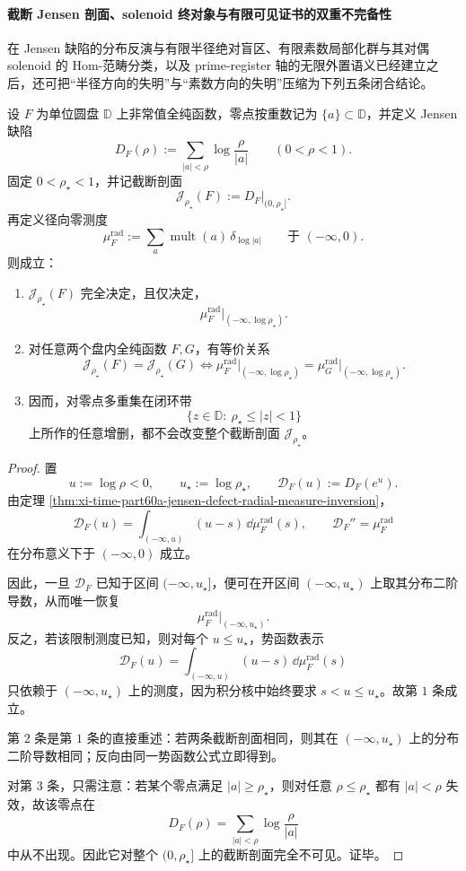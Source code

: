 \paragraph{截断 Jensen 剖面、solenoid 终对象与有限可见证书的双重不完备性}
在 Jensen 缺陷的分布反演与有限半径绝对盲区、有限素数局部化群与其对偶 solenoid 的 \(\mathrm{Hom}\)-范畴分类，以及 prime-register 轴的无限外置语义已经建立之后，还可把“半径方向的失明”与“素数方向的失明”压缩为下列五条闭合结论。

\begin{theorem}\label{thm:xi-time-part60e-truncated-jensen-profile-completeness-blindness}
设 \(F\) 为单位圆盘 \(\mathbb D\) 上非常值全纯函数，零点按重数记为 \(\{a\}\subset\mathbb D\)，并定义 Jensen 缺陷
\[
D_F(\rho):=\sum_{|a|<\rho}\log\frac{\rho}{|a|}
\qquad (0<\rho<1).
\]
固定 \(0<\rho_\star<1\)，并记截断剖面
\[
\mathcal J_{\rho_\star}(F):=D_F|_{(0,\rho_\star]}.
\]
再定义径向零测度
\[
\mu_F^{\mathrm{rad}}
:=
\sum_a \operatorname{mult}(a)\,\delta_{\log|a|}
\qquad\text{于 }(-\infty,0).
\]
则成立：
\begin{enumerate}
  \item \(\mathcal J_{\rho_\star}(F)\) 完全决定，且仅决定，
  \[
  \mu_F^{\mathrm{rad}}\big|_{(-\infty,\log\rho_\star)}.
  \]
  \item 对任意两个盘内全纯函数 \(F,G\)，有等价关系
  \[
  \mathcal J_{\rho_\star}(F)=\mathcal J_{\rho_\star}(G)
  \iff
  \mu_F^{\mathrm{rad}}\big|_{(-\infty,\log\rho_\star)}
  =
  \mu_G^{\mathrm{rad}}\big|_{(-\infty,\log\rho_\star)}.
  \]
  \item 因而，对零点多重集在闭环带
  \[
  \{z\in\mathbb D:\ \rho_\star\le |z|<1\}
  \]
  上所作的任意增删，都不会改变整个截断剖面 \(\mathcal J_{\rho_\star}\)。
\end{enumerate}
\end{theorem}
\begin{proof}
置
\[
u:=\log\rho<0,
\qquad
u_\star:=\log\rho_\star,
\qquad
\mathcal D_F(u):=D_F(e^u).
\]
由定理 \ref{thm:xi-time-part60a-jensen-defect-radial-measure-inversion}，
\[
\mathcal D_F(u)=\int_{(-\infty,u)}(u-s)\,\dd\mu_F^{\mathrm{rad}}(s),
\qquad
\mathcal D_F''=\mu_F^{\mathrm{rad}}
\]
在分布意义下于 \((-\infty,0)\) 成立。

因此，一旦 \(\mathcal D_F\) 已知于区间 \((-\infty,u_\star]\)，便可在开区间 \((-\infty,u_\star)\) 上取其分布二阶导数，从而唯一恢复
\[
\mu_F^{\mathrm{rad}}\big|_{(-\infty,u_\star)}.
\]
反之，若该限制测度已知，则对每个 \(u\le u_\star\)，势函数表示
\[
\mathcal D_F(u)=\int_{(-\infty,u)}(u-s)\,\dd\mu_F^{\mathrm{rad}}(s)
\]
只依赖于 \((-\infty,u_\star)\) 上的测度，因为积分核中始终要求 \(s<u\le u_\star\)。故第 \(1\) 条成立。

第 \(2\) 条是第 \(1\) 条的直接重述：若两条截断剖面相同，则其在 \((-\infty,u_\star)\) 上的分布二阶导数相同；反向由同一势函数公式立即得到。

对第 \(3\) 条，只需注意：若某个零点满足 \(|a|\ge \rho_\star\)，则对任意 \(\rho\le \rho_\star\) 都有 \(|a|<\rho\) 失效，故该零点在
\[
D_F(\rho)=\sum_{|a|<\rho}\log\frac{\rho}{|a|}
\]
中从不出现。因此它对整个 \((0,\rho_\star]\) 上的截断剖面完全不可见。证毕。
\end{proof}


